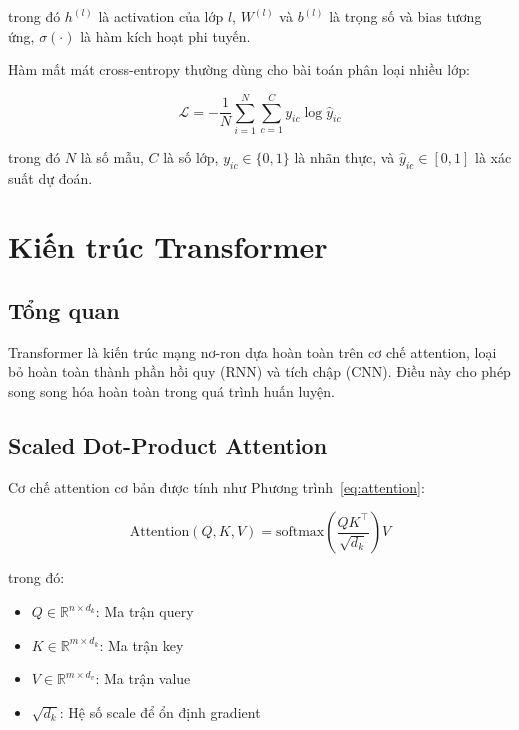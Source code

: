 \documentclass[12pt, a4paper]{report}
\begin{document}
trong đó $h^{(l)}$ là activation của lớp $l$, $W^{(l)}$ và $b^{(l)}$
là trọng số và bias tương ứng, $\sigma(\cdot)$ là hàm kích hoạt phi tuyến.

Hàm mất mát cross-entropy thường dùng cho bài toán phân loại nhiều lớp:

\begin{equation}
  \label{eq:crossentropy}
  \mathcal{L} = -\frac{1}{N}\sum_{i=1}^{N}\sum_{c=1}^{C}
  y_{ic} \log \hat{y}_{ic}
\end{equation}

trong đó $N$ là số mẫu, $C$ là số lớp, $y_{ic} \in \{0,1\}$ là nhãn thực,
và $\hat{y}_{ic} \in [0,1]$ là xác suất dự đoán.

\section{Kiến trúc Transformer}
\label{sec:transformer}

\subsection{Tổng quan}

Transformer \cite{Vaswani2017attention} là kiến trúc mạng nơ-ron
dựa hoàn toàn trên cơ chế attention, loại bỏ hoàn toàn thành phần
hồi quy (RNN) và tích chập (CNN). Điều này cho phép song song hóa
hoàn toàn trong quá trình huấn luyện.

\subsection{Scaled Dot-Product Attention}

Cơ chế attention cơ bản được tính như Phương trình~\eqref{eq:attention}:

\begin{equation}
  \label{eq:attention}
  \text{Attention}(Q, K, V) = \text{softmax}\!\left(\frac{QK^\top}{\sqrt{d_k}}\right)V
\end{equation}

trong đó:
\begin{itemize}
  \item $Q \in \mathbb{R}^{n \times d_k}$: Ma trận query
  \item $K \in \mathbb{R}^{m \times d_k}$: Ma trận key
  \item $V \in \mathbb{R}^{m \times d_v}$: Ma trận value
  \item $\sqrt{d_k}$: Hệ số scale để ổn định gradient
\end{itemize}
\end{document}

